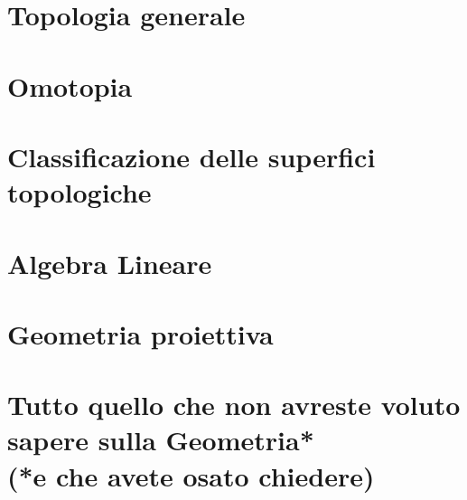 \documentclass[a4paper, 11pt, twoside, openright, italian]{memoir}
\begin{document}
\frontmatter




\mainmatter

\part{Topologia generale}






\part{Omotopia}


\part{Classificazione delle superfici topologiche}

\part{Algebra Lineare}

\part{Geometria proiettiva}


\appendix
\part{Tutto quello che non avreste voluto sapere sulla Geometria*\\
\small{(*e che avete osato chiedere)}}




\backmatter

\end{document}
